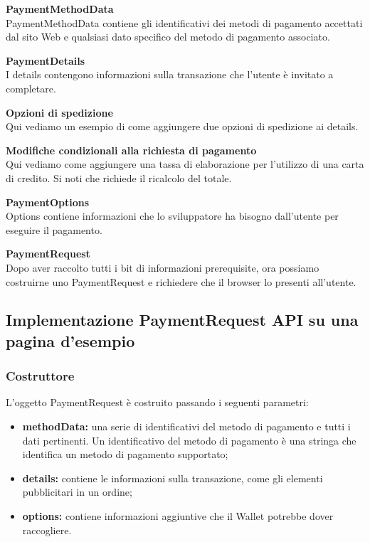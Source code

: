 \documentclass[11pt ,a4paper , twoside , openright ]{article}
\begin{document}
\pagebreak
\textbf{PaymentMethodData}
\\
PaymentMethodData \cite{rif11} contiene gli identificativi dei metodi di pagamento accettati dal sito Web e qualsiasi dato specifico del metodo di pagamento associato.

\textbf{PaymentDetails}
\\
I details \cite{rif14} contengono informazioni sulla transazione che l'utente è invitato a completare.

\pagebreak
\textbf{Opzioni di spedizione}
\\
Qui vediamo un esempio di come aggiungere due opzioni di spedizione ai details. \cite{rif16}


\flushleft\textbf{Modifiche condizionali alla richiesta di pagamento}
\\
Qui vediamo come aggiungere una tassa di elaborazione per l'utilizzo di una carta di credito. Si noti che richiede il ricalcolo del totale.

\pagebreak
\textbf{PaymentOptions} \\
Options contiene informazioni che lo sviluppatore ha bisogno dall'utente per eseguire il pagamento.


\textbf{PaymentRequest} \\
Dopo aver raccolto tutti i bit di informazioni prerequisite, ora possiamo costruirne uno PaymentRequest e richiedere che il browser lo presenti all'utente.



\subsection{Implementazione PaymentRequest API su una pagina d'esempio \cite{rif15}}
\subsubsection{Costruttore}
L'oggetto PaymentRequest è costruito passando i seguenti parametri:
\begin{itemize}
	\item \textbf{methodData:} una serie di identificativi del metodo di pagamento e tutti i dati pertinenti. Un identificativo del metodo di pagamento è una stringa che identifica un metodo di pagamento supportato;
	\item \textbf{details:} contiene le informazioni sulla transazione, come gli elementi pubblicitari in un ordine;
	\item \textbf{options:} contiene informazioni aggiuntive che il Wallet potrebbe dover raccogliere.
\end{itemize}
\end{document}
